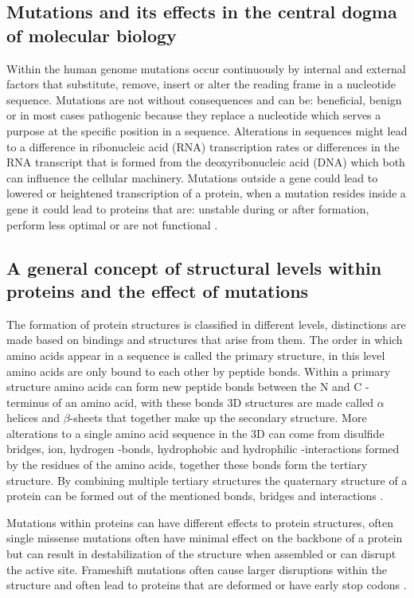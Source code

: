 \subsection{Mutations and its effects in the central dogma of molecular biology}
Within the human genome mutations occur continuously by internal and external factors that substitute, remove, insert or alter the reading frame in a nucleotide sequence. Mutations are not without consequences and can be: beneficial, benign or in most cases pathogenic because they replace a nucleotide which serves a purpose at the specific position in a sequence. Alterations in sequences might lead to a difference in ribonucleic acid (RNA) transcription rates or differences in the RNA transcript that is formed from the deoxyribonucleic acid (DNA) which both can influence the cellular machinery. Mutations outside a gene could lead to lowered or heightened transcription of a protein, when a mutation resides inside a gene it could lead to proteins that are: unstable during or after formation, perform less optimal or are not functional \cite{}.

\subsection{A general concept of structural levels within proteins and the effect of mutations}
The formation of protein structures is classified in different levels, distinctions are made based on bindings and structures that arise from them. 
The order in which amino acids appear in a sequence is called the primary structure, in this level amino acids are only bound to each other by peptide bonds. 
Within a primary structure amino acids can form new peptide bonds between the N and C -terminus of an amino acid, with these bonds 3D structures are made called $\alpha$ helices and $\beta$-sheets that together make up the secondary structure.
More alterations to a single amino acid sequence in the 3D can come from disulfide bridges, ion, hydrogen -bonds, hydrophobic and hydrophilic -interactions formed by the residues of the amino acids, together these bonds form the tertiary structure.
By combining multiple tertiary structures the quaternary structure of a protein can be formed out of the mentioned bonds, bridges and interactions \cite{}.

Mutations within proteins can have different effects to protein structures, often single missense mutations often have minimal effect on the backbone of a protein \cite{} but can result in destabilization of the structure when assembled or can disrupt the active site. Frameshift mutations often cause larger disruptions within the structure and often lead to proteins that are deformed or have early stop codons \cite{}.
\label{subsec:GD_Structural_Levels_and_Mutation_Effects}


